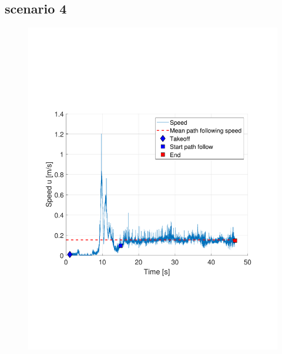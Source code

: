 \documentclass[numbered,pdftex]{ohio-etd}
\begin{document}
\subsection{scenario 4}
\begin{figure}[H]
	\centering
	\includegraphics[trim = 0 150 0 200, clip, width=12cm]{Figures/results/compareFigures/2u}
	\caption{}
	\label{fig:4u}
\end{figure}
\end{document}
